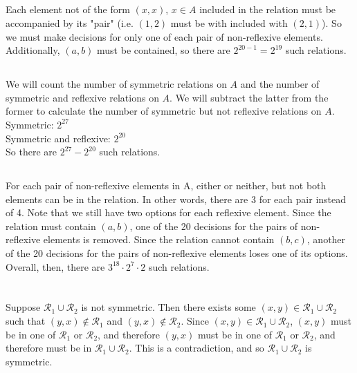 \documentclass{article}
\begin{document}
\subsection{} %
Each element not of the form $(x,x)$, $x\in A$ included in the relation must be
accompanied by its "pair" (i.e. $(1,2)$ must be with included with $(2,1)$). So
we must make decisions for only one of each pair of non-reflexive elements.
Additionally, $(a,b)$ must be contained, so there are $2^{20-1}=2^{19}$ such
relations.
\subsection{} %
We will count the number of symmetric relations on $A$ and the number of
symmetric and reflexive relations on $A$. We will subtract the latter from the
former to calculate the number of symmetric but not reflexive relations on $A$.\\
Symmetric: $2^{27}$\\
Symmetric and reflexive: $2^{20}$\\
So there are $2^{27}-2^{20}$ such relations.
\subsection{} %
For each pair of non-reflexive elements in A, either or neither, but not both
elements can be in the relation. In other words, there are 3 for each pair
instead of 4. Note that we still have two options for each reflexive element.
Since the relation must contain $(a,b)$, one of the 20 decisions for the pairs
of non-reflexive elements is removed. Since the relation cannot contain $(b,c)$,
another of the 20 decisions for the pairs of non-reflexive elements loses one of
its options. Overall, then, there are $3^{18}\cdot2^7\cdot2$ such relations.
\section{} %
\subsection{} %
Suppose $\mathcal R_1 \cup \mathcal R_2$ is not symmetric. Then there exists
some $(x,y)\in\mathcal R_1 \cup \mathcal R_2$ such that $(y,x)\not\in\mathcal R_1$
and $(y,x)\not\in\mathcal R_2$. Since $(x,y)\in\mathcal R_1 \cup \mathcal R_2$,
$(x,y)$ must be in one of $\mathcal R_1$ or $\mathcal R_2$, and therefore $(y,x)$
must be in one of $\mathcal R_1$ or $\mathcal R_2$, and therefore must be in
$\mathcal R_1 \cup \mathcal R_2$. This is a contradiction, and so
$\mathcal R_1 \cup \mathcal R_2$ is symmetric.
\end{document}
